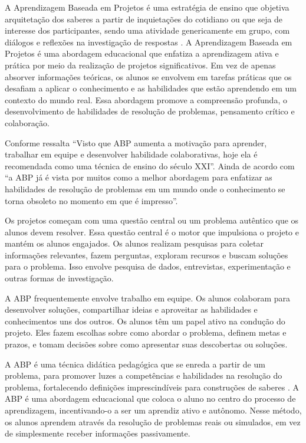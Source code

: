 A Aprendizagem Baseada em Projetos é uma estratégia de ensino que objetiva arquitetação dos saberes a partir de inquietações do cotidiano ou que seja de interesse dos participantes, sendo uma atividade genericamente em grupo, com diálogos e reflexões na investigação de respostas \cite{BENDER2015}. A Aprendizagem Baseada em Projetos é uma abordagem educacional que enfatiza a aprendizagem ativa e prática por meio da realização de projetos significativos. Em vez de apenas absorver informações teóricas, os alunos se envolvem em tarefas práticas que os desafiam a aplicar o conhecimento e as habilidades que estão aprendendo em um contexto do mundo real. Essa abordagem promove a compreensão profunda, o desenvolvimento de habilidades de resolução de problemas, pensamento crítico e colaboração.

Conforme  ressalta ``Visto que ABP aumenta a motivação para aprender, trabalhar em equipe e desenvolver habilidade colaborativas, hoje ela é recomendada como uma técnica de ensino do século XXI''. Ainda de acordo com  ``a ABP já é vista por muitos como a melhor abordagem para enfatizar as habilidades de resolução de problemas em um mundo onde o conhecimento se torna obsoleto no momento em que é impresso''.

Os projetos começam com uma questão central ou um problema autêntico que os alunos devem resolver. Essa questão central é o motor que impulsiona o projeto e mantém os alunos engajados. Os alunos realizam pesquisas para coletar informações relevantes, fazem perguntas, exploram recursos e buscam soluções para o problema. Isso envolve pesquisa de dados, entrevistas, experimentação e outras formas de investigação.

A ABP frequentemente envolve trabalho em equipe. Os alunos colaboram para desenvolver soluções, compartilhar ideias e aproveitar as habilidades e conhecimentos uns dos outros. Os alunos têm um papel ativo na condução do projeto. Eles fazem escolhas sobre como abordar o problema, definem metas e prazos, e tomam decisões sobre como apresentar suas descobertas ou soluções.

A ABP é uma técnica didática pedagógica que se enreda a partir de um problema, para promover luzes a competências e habilidades na resolução do problema, fortalecendo definições imprescindíveis para construções de saberes \cite{SILVA_LINS_LEAO2019}. A ABP é uma abordagem educacional que coloca o aluno no centro do processo de aprendizagem, incentivando-o a ser um aprendiz ativo e autônomo. Nesse método, os alunos aprendem através da resolução de problemas reais ou simulados, em vez de simplesmente receber informações passivamente.

